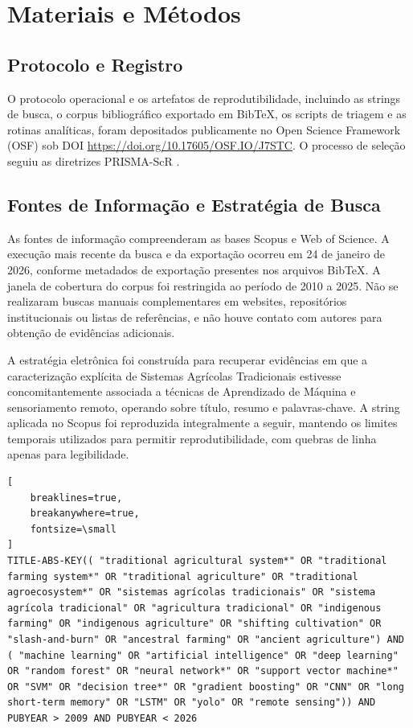 \section[Materiais e Métodos]{Materiais e Métodos}

\subsection[Protocolo e Registro]{Protocolo e Registro}

O protocolo operacional e os artefatos de reprodutibilidade, incluindo as strings de busca, o corpus bibliográfico exportado em BibTeX, os scripts de triagem e as rotinas analíticas, foram depositados publicamente no Open Science Framework (OSF) sob DOI \url{https://doi.org/10.17605/OSF.IO/J7STC}. O processo de seleção seguiu as diretrizes PRISMA-ScR \cite{Tricco2018b}.

\subsection[Fontes de Informação e Estratégia de Busca]{Fontes de Informação e Estratégia de Busca}

As fontes de informação compreenderam as bases Scopus e Web of Science. A execução mais recente da busca e da exportação ocorreu em 24 de janeiro de 2026, conforme metadados de exportação presentes nos arquivos BibTeX. A janela de cobertura do corpus foi restringida ao período de 2010 a 2025. Não se realizaram buscas manuais complementares em websites, repositórios institucionais ou listas de referências, e não houve contato com autores para obtenção de evidências adicionais.

A estratégia eletrônica foi construída para recuperar evidências em que a caracterização explícita de Sistemas Agrícolas Tradicionais estivesse concomitantemente associada a técnicas de Aprendizado de Máquina e sensoriamento remoto, operando sobre título, resumo e palavras-chave. A string aplicada no Scopus foi reproduzida integralmente a seguir, mantendo os limites temporais utilizados para permitir reprodutibilidade, com quebras de linha apenas para legibilidade.

\begin{Verbatim}[
	breaklines=true,
	breakanywhere=true,
	fontsize=\small
]
TITLE-ABS-KEY(( "traditional agricultural system*" OR "traditional farming system*" OR "traditional agriculture" OR "traditional agroecosystem*" OR "sistemas agrícolas tradicionais" OR "sistema agrícola tradicional" OR "agricultura tradicional" OR "indigenous farming" OR "indigenous agriculture" OR "shifting cultivation" OR "slash-and-burn" OR "ancestral farming" OR "ancient agriculture") AND ( "machine learning" OR "artificial intelligence" OR "deep learning" OR "random forest" OR "neural network*" OR "support vector machine*" OR "SVM" OR "decision tree*" OR "gradient boosting" OR "CNN" OR "long short-term memory" OR "LSTM" OR "yolo" OR "remote sensing")) AND PUBYEAR > 2009 AND PUBYEAR < 2026
\end{Verbatim}

